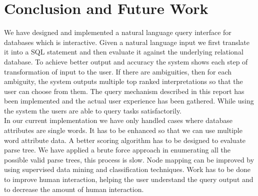 \chapter{Conclusion and Future Work}

We have designed and implemented a natural language query
interface for databases which is interactive. Given a natural language
input we first translate it into a SQL statement and
then evaluate it against the underlying relational database. To achieve better output and accuracy the system shows each step of transformation of input to the user. If there are ambiguities, then for each ambiguity, the system outputs multiple top ranked interpretations so that the user can choose from them. The query mechanism described in this report has been implemented and the actual user experience has been gathered. While using the system the users are
able to query tasks satisfactorily.\\
In our current implementation we have only handled cases where database attributes are single words. It has to be enhanced so that we can use multiple word attribute data. A better scoring algorithm has to be designed to evaluate parse tree. We have applied a brute force approach in enumerating all the possible valid parse trees, this process is slow. Node mapping can be improved by using supervised data mining and classification techniques. Work has to be done to improve human interaction, helping the user understand the query output and to decrease the amount of human interaction.